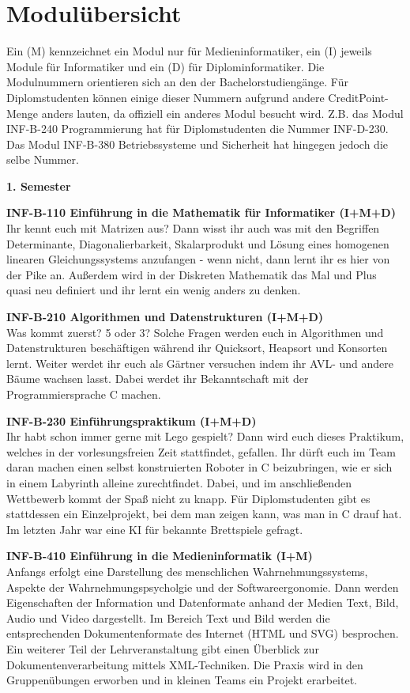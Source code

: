\section{Modulübersicht}

Ein (M) kennzeichnet ein Modul nur für Medieninformatiker, ein (I) jeweils Module für Informatiker und ein (D) für Diplominformatiker.
Die Modulnummern orientieren sich an den der Bachelorstudiengänge.
Für Diplomstudenten können einige dieser Nummern aufgrund andere CreditPoint-Menge anders lauten, da offiziell ein anderes Modul besucht wird.
Z.B. das Modul INF-B-240 Programmierung hat für Diplomstudenten die Nummer INF-D-230.
Das Modul INF-B-380 Betriebssysteme und Sicherheit hat hingegen jedoch die selbe Nummer.

\textbf{1. Semester}

\textbf{INF-B-110 Einführung in die Mathematik für Informatiker (I+M+D)} \\
Ihr kennt euch mit Matrizen aus?
Dann wisst ihr auch was mit den Begriffen Determinante, Diagonalierbarkeit, Skalarprodukt und Lösung eines homogenen linearen Gleichungssystems anzufangen - wenn nicht, dann lernt ihr es hier von der Pike an.
Außerdem wird in der Diskreten Mathematik das Mal und Plus quasi neu definiert und ihr lernt ein wenig anders zu denken.

\textbf{INF-B-210 Algorithmen und Datenstrukturen (I+M+D)} \\
Was kommt zuerst?
5 oder 3?
Solche Fragen werden euch in Algorithmen und Datenstrukturen beschäftigen während ihr Quicksort, Heapsort und Konsorten lernt.
Weiter werdet ihr euch als Gärtner versuchen indem ihr AVL- und andere Bäume wachsen lasst.
Dabei werdet ihr Bekanntschaft mit der Programmiersprache C machen.

\textbf{INF-B-230 Einführungspraktikum (I+M+D)} \\
Ihr habt schon immer gerne mit Lego gespielt?
Dann wird euch dieses Praktikum, welches in der vorlesungsfreien Zeit stattfindet, gefallen.
Ihr dürft euch im Team daran machen einen selbst konstruierten Roboter in C beizubringen, wie er sich in einem Labyrinth alleine zurechtfindet.
Dabei, und im anschließenden Wettbewerb kommt der Spaß nicht zu knapp.
Für Diplomstudenten gibt es stattdessen ein Einzelprojekt, bei dem man zeigen kann, was man in C drauf hat.
Im letzten Jahr war eine KI für bekannte Brettspiele gefragt.

\textbf{INF-B-410 Einführung in die Medieninformatik (I+M)} \\
Anfangs erfolgt eine Darstellung des menschlichen Wahrnehmungssystems, Aspekte der Wahrnehmungspsycholgie und der Softwareergonomie.
Dann werden Eigenschaften der Information und Datenformate anhand der Medien Text, Bild, Audio und Video dargestellt.
Im Bereich Text und Bild werden die entsprechenden Dokumentenformate des Internet (HTML und SVG) besprochen.
Ein weiterer Teil der Lehrveranstaltung gibt einen Überblick zur Dokumentenverarbeitung mittels XML-Techniken.
Die Praxis wird in den Gruppenübungen erworben und in kleinen Teams ein Projekt erarbeitet.

